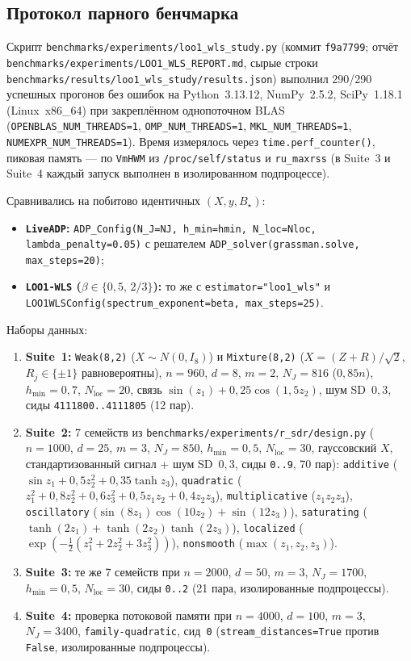 \documentclass[11pt,a4paper]{article}
\numberwithin{equation}{section}
\theoremstyle{definition}
\theoremstyle{remark}
\newcommand{\code}[1]{\nolinkurl{#1}}
\begin{document}
\subsection{Протокол парного бенчмарка}
\label{sec:bench-protocol}

Скрипт \code{benchmarks/experiments/loo1_wls_study.py} (коммит \code{f9a7799};
отчёт \code{benchmarks/experiments/LOO1_WLS_REPORT.md}, сырые строки
\code{benchmarks/results/loo1_wls_study/results.json}) выполнил 290/290 успешных
прогонов без ошибок на Python~3.13.12, NumPy~2.5.2, SciPy~1.18.1 (Linux~x86\_64)
при закреплённом однопоточном BLAS (\code{OPENBLAS_NUM_THREADS=1}, \code{OMP_NUM_THREADS=1},
\code{MKL_NUM_THREADS=1}, \code{NUMEXPR_NUM_THREADS=1}).
Время измерялось через \code{time.perf_counter()}, пиковая память — по \code{VmHWM}
из \code{/proc/self/status} и \code{ru_maxrss} (в Suite~3 и Suite~4 каждый запуск выполнен
в изолированном подпроцессе).

Сравнивались на побитово идентичных $(X, y, B_\star)$:
\begin{itemize}
  \item \textbf{\texttt{LiveADP}:} \code{ADP_Config(N_J=NJ, h_min=hmin, N_loc=Nloc, lambda_penalty=0.05)}
  с решателем \code{ADP_solver(grassman.solve, max_steps=20)};
  \item \textbf{\texttt{LOO1-WLS} ($\beta \in \{0{,}5,\, 2/3\}$):} то же с \code{estimator="loo1_wls"}
  и \code{LOO1WLSConfig(spectrum_exponent=beta, max_steps=25)}.
\end{itemize}
Наборы данных:
\begin{enumerate}
  \item \textbf{Suite~1:} \texttt{Weak(8,2)} ($X \sim N(0, I_8)$) и \texttt{Mixture(8,2)}
  ($X = (Z + R)/\sqrt{2}$, $R_j \in \{\pm 1\}$ равновероятны), $n=960$, $d=8$, $m=2$,
  $N_J = 816$ ($0{,}85n$), $h_{\min}=0{,}7$, $N_{\mathrm{loc}}=20$,
  связь $\sin(z_1) + 0{,}25\cos(1{,}5 z_2)$, шум SD~$0{,}3$, сиды \code{4111800..4111805} (12 пар).
  \item \textbf{Suite~2:} 7 семейств из \code{benchmarks/experiments/r_sdr/design.py}
  ($n=1000$, $d=25$, $m=3$, $N_J=850$, $h_{\min}=0{,}5$, $N_{\mathrm{loc}}=30$, гауссовский $X$,
  стандартизованный сигнал + шум SD~$0{,}3$, сиды \code{0..9}, 70 пар):
  \texttt{additive} ($\sin z_1 + 0{,}5 z_2^2 + 0{,}35\tanh z_3$),
  \texttt{quadratic} ($z_1^2 + 0{,}8 z_2^2 + 0{,}6 z_3^2 + 0{,}5 z_1 z_2 + 0{,}4 z_2 z_3$),
  \texttt{multiplicative} ($z_1 z_2 z_3$),
  \texttt{oscillatory} ($\sin(8 z_1)\cos(10 z_2) + \sin(12 z_3)$),
  \texttt{saturating} ($\tanh(2 z_1) + \tanh(2 z_2)\tanh(2 z_3)$),
  \texttt{localized} ($\exp(-\frac{1}{2}(z_1^2 + 2z_2^2 + 3z_3^2))$),
  \texttt{nonsmooth} ($\max(z_1, z_2, z_3)$).
  \item \textbf{Suite~3:} те же 7 семейств при $n=2000$, $d=50$, $m=3$, $N_J=1700$,
  $h_{\min}=0{,}5$, $N_{\mathrm{loc}}=30$, сиды \code{0..2} (21 пара, изолированные подпроцессы).
  \item \textbf{Suite~4:} проверка потоковой памяти при $n=4000$, $d=100$, $m=3$, $N_J=3400$,
  \texttt{family-quadratic}, сид~\code{0} (\code{stream_distances=True} против \code{False}, изолированные подпроцессы).
\end{enumerate}
\end{document}
